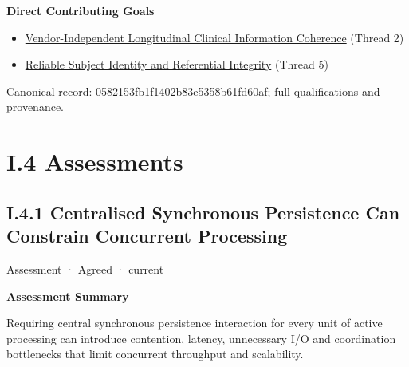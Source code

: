 \par\medskip\textbf{Direct Contributing Goals}\par


\begin{itemize}


\item \href{\detokenize{../../../../../../../../../docs/markdown/01-motivation/goals-outcomes/strategic-goals.md}}{Vendor-Independent Longitudinal Clinical Information Coherence} (Thread 2)

\item \href{\detokenize{../../../../../../../../../docs/markdown/01-motivation/goals-outcomes/strategic-goals.md}}{Reliable Subject Identity and Referential Integrity} (Thread 5)

\end{itemize}

{\footnotesize \href{../../../../../../../../continuum/motivation/outcome/0582153fb1f1402b83e5358b61fd60af.md}{Canonical record: 0582153fb1f1402b83e5358b61fd60af}; full qualifications and provenance.}\par
\chapter*{I.4 Assessments}
\label{navigation:I.4}

\section*{I.4.1 Centralised Synchronous Persistence Can Constrain Concurrent Processing}
\label{navigation:I.4.1}

\label{element:4f7b18cecb08415bad2b4247068a511e}
{\small Assessment · Agreed · current}\par

\par\medskip\textbf{Assessment Summary}\par


Requiring central synchronous persistence interaction for every unit of active processing can introduce contention, latency, unnecessary I/O and coordination bottlenecks that limit concurrent throughput and scalability.




